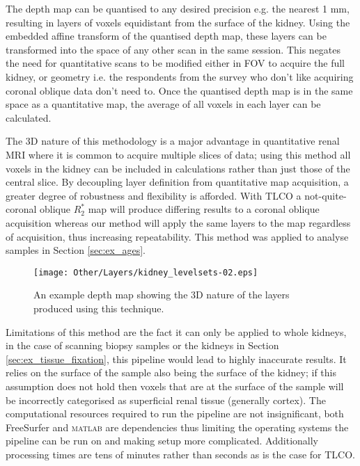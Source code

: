 The depth map can be quantised to any desired precision e.g. the nearest 1 mm, resulting in layers of voxels equidistant from the surface of the kidney. Using the embedded affine transform of the quantised depth map, these layers can be transformed into the space of any other scan in the same session. This negates the need for quantitative scans to be modified either in \ac{FOV} to acquire the full kidney, or geometry i.e. the respondents from the survey who don't like acquiring coronal oblique data don't need to. Once the quantised depth map is in the same space as a quantitative map, the average of all voxels in each layer can be calculated.

The 3D nature of this methodology is a major advantage in quantitative renal \ac{MRI} where it is common to acquire multiple slices of data; using this method all voxels in the kidney can be included in calculations rather than just those of the central slice. By decoupling layer definition from quantitative map acquisition, a greater degree of robustness and flexibility is afforded. With \ac{TLCO} a not-quite-coronal oblique $R_2^*$ map will produce differing results to a coronal oblique acquisition whereas our method will apply the same layers to the map regardless of acquisition, thus increasing repeatability. This method was applied to analyse samples in Section \ref{sec:ex_ages}.

\begin{figure}[H]
	\centering
	\texttt{[image: Other/Layers/kidney\_levelsets-02.eps]}
	\caption{An example depth map showing the 3D nature of the layers produced using this technique.}
	\label{fig:ex_layers_kidney}
\end{figure}

Limitations of this method are the fact it can only be applied to whole kidneys, in the case of scanning biopsy samples or the kidneys in Section \ref{sec:ex_tissue_fixation}, this pipeline would lead to highly inaccurate results. It relies on the surface of the sample also being the surface of the kidney; if this assumption does not hold then voxels that are at the surface of the sample will be incorrectly categorised as superficial renal tissue (generally cortex). The computational resources required to run the pipeline are not insignificant, both FreeSurfer and \textsc{matlab} are dependencies thus limiting the operating systems the pipeline can be run on and making setup more complicated. Additionally processing times are tens of minutes rather than seconds as is the case for \ac{TLCO}.

